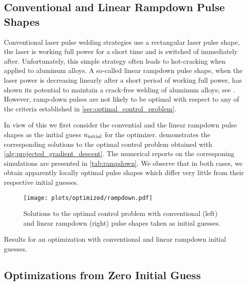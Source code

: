 \subsection{Conventional and Linear Rampdown Pulse Shapes}

Conventional laser pulse welding strategies use a rectangular laser pulse shape, \ie the laser is working full power for a short time and is switched of immediately after. 
Unfortunately, this simple strategy often leads to hot-cracking when applied to aluminum alloys.
A so-called linear rampdown pulse shape, \ie when the laser power is decreasing linearly after a short period of working full power, has shown its potential to maintain a crack-free welding of aluminum alloys; see \cite{JiaZhangYuShiLiuWuYeWangTian:2021:1}.
However, ramp-down pulses are not likely to be optimal with respect to any of the criteria established in \cref{sec:optimal_control_problem}.

In view of this we first consider the convential and the linear rampdown pulse shapes as the initial guess $u_\textup{initial}$ for the optimizer. 
 demonstrates the corresponding solutions to the optimal control problem obtained with \cref{alg:projected_gradient_descent}.
The numerical reports on the corresponing simulations are presented in \cref{tab:rampdown}.
We observe that in both cases, we obtain apparently locally optimal pulse shapes which differ very little from their respective initial guesses.

\begin{figure} 
	\centering
	\texttt{[image: plots/optimized/rampdown.pdf]}
	\caption{Solutions to the optimal control problem with conventional (left) and linear rampdown (right) pulse shapes taken as initial guesses.}
	\label{fig:rampdown}
\end{figure}

\begin{table} 
	\centering
	
	\caption{Results for an optimization with conventional and linear rampdown initial guesses.}
	\label{tab:rampdown}
\end{table}



\subsection{Optimizations from Zero Initial Guess}


